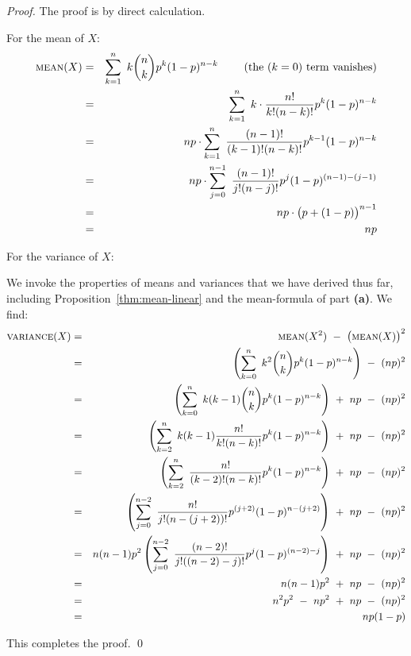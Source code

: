 \begin{proof}
The proof is by direct calculation.

\smallskip

 For the mean of $X$:
\begin{eqnarray*} 
\mbox{\sc mean}(X) & = &
\sum_{k=1}^n \ k {n \choose k} p^k (1-p)^{n-k} \ \ \ \ \ \ \ \mbox{(the $(k=0)$ term vanishes)} \\
  & = &
\sum_{k=1}^n \ k \cdot \frac{n!}{k! (n-k)!} p^k (1-p)^{n-k} \\
  & = &
np \cdot \sum_{k=1}^n \ \frac{(n-1)!}{(k-1)! (n-k)!} p^{k-1} (1-p)^{n-k} \\
  & = &
np \cdot \sum_{j=0}^{n-1} \ \frac{(n-1)!}{j! (n-j)!} p^{j} (1-p)^{(n-1)-(j-1)} \\
  & = &
np \cdot \big(p + (1-p) \big)^{n-1} \\
  & = &
np
\end{eqnarray*}

\medskip

 For the variance of $X$:

\smallskip

We invoke the properties of means and variances that we have derived thus far, including Proposition~\ref{thm:mean-linear} and the mean-formula of part {\bf (a)}.  We find:
\begin{eqnarray*} 
\mbox{\sc variance}(X) & = & 
\mbox{\sc mean}(X^2) \ - \  \big(\mbox{\sc mean}(X) \big)^2 \\
  & = &
\left( \sum_{k=0}^n \ k^2 {n \choose k} p^k (1-p)^{n-k} \right)
 \ - \ (np)^2  \\
  & = &
\left( \sum_{k=0}^n \ k(k-1) {n \choose k} p^k (1-p)^{n-k} \right)
 \ + \ np
 \ - \ (np)^2  \\
  & = &
\left( \sum_{k=2}^n \ k(k-1) \frac{n!}{k! (n-k)!} p^k (1-p)^{n-k} \right)
 \ + \ np
 \ - \ (np)^2  \\
  & = &
\left( \sum_{k=2}^n \ \frac{n!}{(k-2)! (n-k)!} p^k (1-p)^{n-k} \right)
 \ + \ np
 \ - \ (np)^2 \\
  & = &
\left( \sum_{j=0}^{n-2} \ \frac{n!}{j! (n-(j+2))!} p^{(j+2)} (1-p)^{n-(j+2)} \right)
 \ + \ np
 \ - \ (np)^2 \\
   & = &
n(n-1)p^2 \left( \sum_{j=0}^{n-2} \ \frac{(n-2)!}{j! ((n-2)-j)!} p^j (1-p)^{(n-2)-j} \right)
 \ + \ np
 \ - \ (np)^2 \\
     & = &
n(n-1)p^2  \ + \ np \ - \ (np)^2 \\
     & = &
n^2 p^2 \ - \ n p^2  \ + \ np \ - \ (np)^2 \\
     & = &
n p (1-p)
\end{eqnarray*}

\smallskip

\noindent
This completes the proof. \qed
\end{proof}

